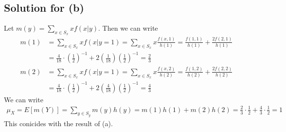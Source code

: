 \documentclass{scrartcl}
\begin{document}
\subsection{Solution for (b)}
Let \(m(y) = \sum_{x \in S_x} x f(x | y)\). Then we can write
\begin{align*}
  m(1)
  &= \sum_{x \in S_x} x f(x | y = 1)
  = \sum_{x \in S_x} x \frac{f(x, 1)}{h(1)}
  = \frac{f(1, 1)}{h(1)} + \frac{2f(2, 1)}{h(1)} \\
  &= \frac{4}{18} \cdot \left( \frac{1}{2} \right)^{-1}
    + 2 \left( \frac{1}{18} \right) \left( \frac{1}{2} \right)^{-1}
  = \frac{2}{3} \\
  m(2)
  &= \sum_{x \in S_x} x f(x | y = 1)
  = \sum_{x \in S_x} x \frac{f(x, 2)}{h(2)}
  = \frac{f(1, 2)}{h(2)} + \frac{2f(2, 2)}{h(2)} \\
  &= \frac{4}{18} \cdot \left( \frac{1}{2} \right)^{-1}
    + 2 \left( \frac{4}{18} \right) \left( \frac{1}{2} \right)^{-1}
  = \frac{4}{3}
\end{align*}
We can write
\begin{align*}
  \mu_X
  = E[m(Y)]
  = \sum_{y \in S_y} m(y) h(y)
  = m(1) h(1) + m(2) h(2)
  = \frac{2}{3} \cdot \frac{1}{2} + \frac{4}{3} \cdot \frac{1}{2}
  = 1
\end{align*}
This conicides with the result of (a).
\end{document}
